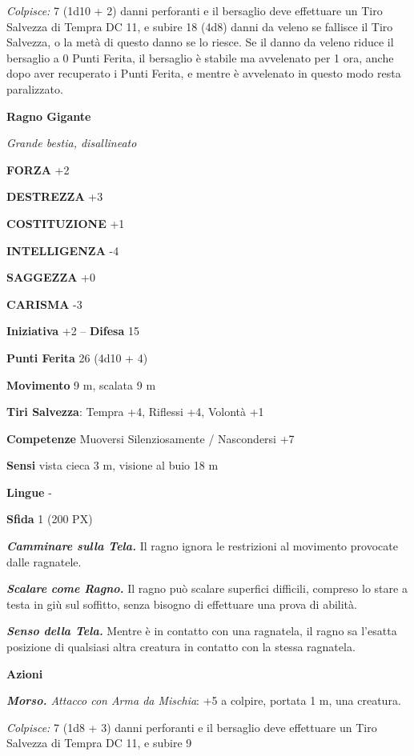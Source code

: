 \begin{multicols}{2}
\textit{Colpisce:} 7 (1d10 + 2) danni perforanti e il bersaglio deve effettuare un Tiro Salvezza di Tempra DC 11, e subire 18 (4d8) danni da veleno se fallisce il Tiro Salvezza, o la metà di questo danno se lo riesce. Se il danno da veleno riduce il bersaglio a 0 Punti Ferita, il bersaglio è stabile ma avvelenato per 1 ora, anche dopo aver recuperato i Punti Ferita, e mentre è avvelenato in questo modo resta paralizzato.

\medskip\textbf{Ragno Gigante}

\textit{Grande bestia, disallineato}

\textbf{FORZA} +2

\textbf{DESTREZZA} +3

\textbf{COSTITUZIONE} +1

\textbf{INTELLIGENZA} -4

\textbf{SAGGEZZA} +0

\textbf{CARISMA} -3

\textbf{Iniziativa} +2 -- \textbf{Difesa} 15

\textbf{Punti Ferita} 26 (4d10 + 4)

\textbf{Movimento} 9 m, scalata 9 m

\textbf{Tiri Salvezza}: Tempra +4, Riflessi +4, Volontà +1

\textbf{Competenze} Muoversi Silenziosamente / Nascondersi +7

\textbf{Sensi} vista cieca 3 m, visione al buio 18 m

\textbf{Lingue} -

\textbf{Sfida} 1 (200 PX)

\textit{\textbf{Camminare sulla Tela.}} Il ragno ignora le restrizioni al movimento provocate dalle ragnatele.

\textit{\textbf{Scalare come Ragno.}} Il ragno può scalare superfici difficili, compreso lo stare a testa in giù sul soffitto, senza bisogno di effettuare una prova di abilità.

\textit{\textbf{Senso della Tela.}} Mentre è in contatto con una ragnatela, il ragno sa l'esatta posizione di qualsiasi altra creatura in contatto con la stessa ragnatela.

\textbf{Azioni}

\textit{\textbf{Morso.} Attacco con Arma da Mischia}: +5 a colpire, portata 1 m, una creatura.

\textit{Colpisce:} 7 (1d8 + 3) danni perforanti e il bersaglio deve effettuare un Tiro Salvezza di Tempra DC 11, e subire 9


\end{multicols}
